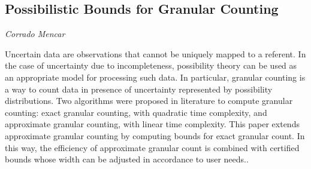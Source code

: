 \documentclass[../booklet.tex]{subfiles}
\begin{document}
\subsection[Possibilistic Bounds for Granular Counting. {\it Corrado Mencar}]{Possibilistic Bounds for Granular Counting}

\begin{center}
  {\it Corrado Mencar}
\end{center}



Uncertain data are observations that cannot be uniquely mapped to
a referent. In the case of uncertainty due to incompleteness, possibility
theory can be used as an appropriate model for processing such data.
In particular, granular counting is a way to count data in presence
of uncertainty represented by possibility distributions. Two algorithms
were proposed in literature to compute granular counting: exact granular
counting, with quadratic time complexity, and approximate granular
counting, with linear time complexity. This paper extends approximate
granular counting by computing bounds for exact granular count. In
this way, the efficiency of approximate granular count is combined
with certified bounds whose width can be adjusted in accordance to
user needs..
\end{document}
